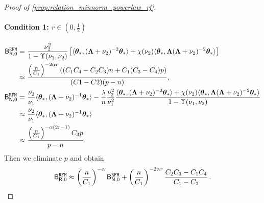 \begin{proof}[Proof of \cref{prop:relation_minnorm_powerlaw_rf}]
\paragraph{Condition 1: $r \in (0, \frac{1}{2})$}
\[
\begin{aligned}
\mathsf B_{\mathsf R,0}^{\tt RFM} =&~ \frac{\nu_2^2}{1 - \Upsilon(\nu_1, \nu_2)} \left[ \langle {\boldsymbol \theta}_*, ({\boldsymbol \Lambda} + \nu_2)^{-2} {\boldsymbol \theta}_* \rangle + \chi(\nu_2) \langle {\boldsymbol \theta}_*, {\boldsymbol \Lambda} ({\boldsymbol \Lambda} + \nu_2)^{-2} {\boldsymbol \theta}_* \rangle \right]\\
\approx&~\frac{\left(\frac{n}{C_1}\right)^{-2\alpha r}\left((C_1C_4 -C_2C_3)n+C_1(C_3-C_4)p\right)}{(C1-C2)(p-n)},\\
\mathsf B_{\mathsf N,0}^{\tt RFM} =&~ \frac{\nu_2}{\nu_1} \langle {\boldsymbol \theta}_*, ({\boldsymbol \Lambda} + \nu_2)^{-1} {\boldsymbol \theta}_* \rangle - \frac{\lambda}{n} \frac{\nu_2^2}{\nu_1^2} \frac{\langle {\boldsymbol \theta}_*, ({\boldsymbol \Lambda} + \nu_2)^{-2} {\boldsymbol \theta}_* \rangle + \chi(\nu_2) \langle {\boldsymbol \theta}_*, {\boldsymbol \Lambda} ({\boldsymbol \Lambda} + \nu_2)^{-2} {\boldsymbol \theta}_* \rangle}{1 - \Upsilon(\nu_1, \nu_2)}\\
\approx&~ \frac{\nu_2}{\nu_1} \langle {\boldsymbol \theta}_*, ({\boldsymbol \Lambda} + \nu_2)^{-1} {\boldsymbol \theta}_* \rangle\\
\approx&~ \frac{\left(\frac{n}{C_1}\right)^{-\alpha(2r-1)}C_3 p}{p-n}.
\end{aligned}
\]
Then we eliminate $p$ and obtain
\begin{equation}\label{eq:B_over_power_law_1}
    \mathsf B_{\mathsf R,0}^{\tt RFM} \approx \left(\frac{n}{C_1}\right)^{-\alpha} \mathsf B_{\mathsf N,0}^{\tt RFM} + \left(\frac{n}{C_1}\right)^{-2\alpha r}\frac{C_2C_3-C_1C_4}{C_1-C_2}\,.
\end{equation}


\end{proof}
